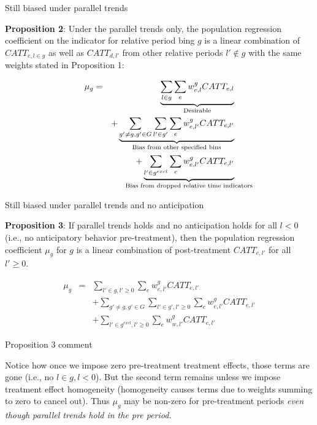 \documentclass{beamer}
\begin{document}
\begin{frame}{Still biased under parallel trends}

\textbf{Proposition 2}: Under the parallel trends only, the population regression coefficient on the indicator for relative period bing $g$ is a linear combination of $CATT_{e,l \in g}$ as well as $CATT_{d,l'}$ from other relative periods $l' \notin g$ with the same weights stated in Proposition 1:

\begin{eqnarray*}
\mu_g &=& \underbrace{\sum_{l \in g} \sum_e w^g_{e,l} CATT_{e,l}}_{\mathclap{\text{Desirable}}} \\
&& + \underbrace{\sum_{g' \neq g, g' \in G} \sum_{l' \in g'} \sum_e w^g_{e,l'}  CATT_{e,l'}}_{\mathclap{\text{Bias from other specified bins}}} \\
&&+ \underbrace{\sum_{l' \in g^{excl}} \sum_e w^g_{e,l'} CATT_{e,l'}}_{\mathclap{\text{Bias from dropped relative time indicators}}}
\end{eqnarray*}



\end{frame}


\begin{frame}{Still biased under parallel trends and no anticipation}

\textbf{Proposition 3}: If parallel trends holds and no anticipation holds for all $l<0$ (i.e., no anticipatory behavior pre-treatment), then the population regression coefficient $\mu_g$ for $g$ is a linear combination of post-treatment $CATT_{e,l'}$ for all $l' \geq 0$.

\begin{eqnarray*}
\mu_g &=& \sum_{l' \in g, l' \geq 0} \sum_e w^g_{e,l'} CATT_{e,l'} \\
&&+ \sum_{g' \neq g,g' \in G} \sum_{l' \in g', l' \geq 0} \sum_e w^g_{e,l'} CATT_{e,l'} \\
&&+ \sum_{l' \in g^{excl},l' \geq 0} \sum_e w^g_{w,l'} CATT_{e,l'}
\end{eqnarray*}

\end{frame}

\begin{frame}{Proposition 3 comment}

Notice how once we impose zero pre-treatment treatment effects, those terms are gone (i.e., no $l \in g, l<0$).  But the second term remains unless we impose treatment effect homogeneity (homogeneity causes terms due to weights summing to zero to cancel out). Thus $\mu_g$ may be non-zero for pre-treatment periods \emph{even though parallel trends hold in the pre period.}

\end{frame}
\end{document}
